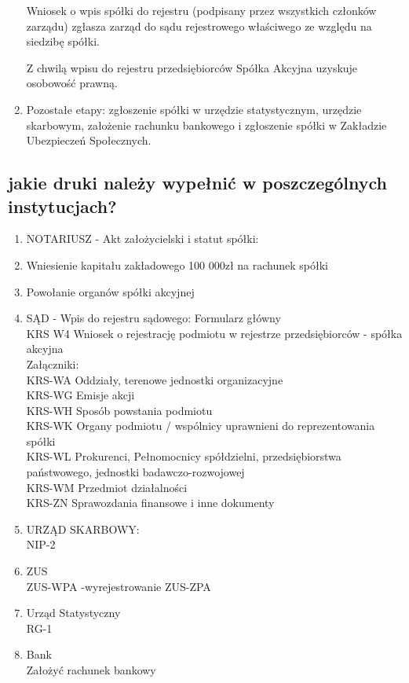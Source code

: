 \documentclass[a4paper, 11pt]{article}
\begin{document}
\begin{enumerate}
Wniosek o wpis spółki do rejestru (podpisany przez wszystkich członków zarządu) zgłasza zarząd do sądu rejestrowego właściwego ze względu na siedzibę spółki.
 
Z chwilą wpisu do rejestru przedsiębiorców Spółka Akcyjna uzyskuje osobowość prawną.

\item Pozostałe etapy:
zgłoszenie spółki w urzędzie statystycznym,
urzędzie skarbowym,
założenie rachunku bankowego i zgłoszenie spółki w Zakładzie Ubezpieczeń Społecznych.

\end{enumerate}

\subsection{jakie druki należy wypełnić w poszczególnych instytucjach?}
\begin{enumerate}
\item NOTARIUSZ - Akt założycielski i statut spółki:
	
\item Wniesienie kapitału zakładowego 100 000zł na rachunek spółki
\item Powołanie organów spółki akcyjnej
\item SĄD - Wpis do rejestru sądowego: 
Formularz główny\\
KRS W4 	Wniosek o rejestrację podmiotu w rejestrze przedsiębiorców - spółka akcyjna\\
Załączniki:\\
KRS-WA Oddziały, terenowe jednostki organizacyjne\\
KRS-WG 	Emisje akcji\\
KRS-WH Sposób powstania podmiotu\\
KRS-WK Organy podmiotu / wspólnicy uprawnieni do reprezentowania spółki\\
KRS-WL 	Prokurenci, Pełnomocnicy spółdzielni, przedsiębiorstwa państwowego, jednostki badawczo-rozwojowej\\
KRS-WM Przedmiot działalności\\
KRS-ZN Sprawozdania finansowe i inne dokumenty\\

\item URZĄD SKARBOWY:\\
	NIP-2
\item ZUS\\
 ZUS-WPA -wyrejestrowanie
	ZUS-ZPA
\item Urząd Statystyczny\\
	RG-1
\item Bank\\
	Założyć rachunek bankowy
\end{enumerate}
\end{document}
